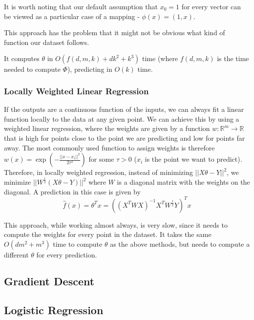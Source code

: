 \documentclass{article}
\newcommand{\R}{\mathbb{R}}
\begin{document}
It is worth noting that our default assumption that $x_0 = 1$ for every vector can be viewed as a particular case of a mapping - $\phi(x) = (1, x)$.

This approach has the problem that it might not be obvious what kind of function our dataset follows.

It computes $\theta$ in $O(f(d,m,k) + dk^2 + k^3)$ time (where $f(d,m,k)$ is the time needed to compute $\Phi$), predicting in $O(k)$ time.

\subsubsection{Locally Weighted Linear Regression}

If the outputs are a continuous function of the inputs, we can always fit a linear function locally to the data at any given point.
We can achieve this by using a weighted linear regression, where the weights are given by a function $w: \R^m \to \R$ that is high for points close to the point we are predicting and low for points far away.
The most commonly used function to assign weights is therefore $w(x) = \exp(-\frac{||x - x_i||^2}{2\tau^2})$ for some $\tau > 0$ ($x_i$ is the point we want to predict).
Therefore, in locally weighted regression, instead of minimizing $||X \theta - Y||^2$, we minimize $||W^{\frac{1}{2}}(X \theta - Y)||^2$ where $W$ is a diagonal matrix with the weights on the diagonal.
A prediction in this case is given by
$$
\hat{f}(x) = \theta^T x = ((X^T W X)^{-1} X^T W^{\frac{1}{2}} Y)^T x
$$

This approach, while working almost always, is very slow, since it needs to compute the weights for every point in the dataset.
It takes the same $O(dm^2 + m^3)$ time to compute $\theta$ as the above methods, but needs to compute a different $\theta$ for every prediction.

\subsection{Gradient Descent}

\subsection{Logistic Regression}
\end{document}
